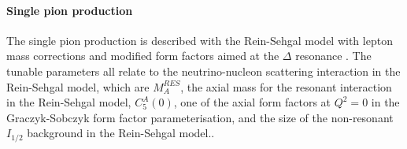 \paragraph{Single pion production}
The single pion production is described with the Rein-Sehgal model\cite{Rein_Sehgal, Rein_Angular} with lepton mass corrections \cite{Kuzmin_MassEffect,Wroclaw_MassEffect,Berger_Sehgal_MassEffect} and modified form factors aimed at the $\Delta$ resonance \cite{Wroclaw_CC1pi_2014,Wroclaw_CC1pi_2009,Wroclaw_CC1pi_theory}. The tunable parameters all relate to the neutrino-nucleon scattering interaction in the Rein-Sehgal model, which are $M_A^{RES}$, the axial mass for the resonant interaction in the Rein-Sehgal model, $C_5^A(0)$, one of the axial form factors at $Q^2=0$ in the Graczyk-Sobczyk form factor parameterisation, and the size of the non-resonant $I_{1/2}$ background in the Rein-Sehgal model.. 

